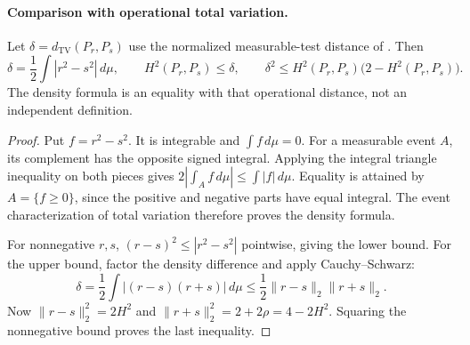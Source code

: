 \paragraph{Comparison with operational total variation.}

\begin{theorem}
\label{thm:hellinger-tv}
Let $\delta=d_{\mathrm{TV}}(P_r,P_s)$ use the normalized
measurable-test distance of . Then
\[
 \delta=\frac12\int|r^2-s^2|\,d\mu,
 \qquad
 H^2(P_r,P_s)\le\delta,
 \qquad
 \delta^2\le H^2(P_r,P_s)\bigl(2-H^2(P_r,P_s)\bigr).
\]
The density formula is an equality with that operational distance,
not an independent definition.
\end{theorem}
\begin{proof}
Put $f=r^2-s^2$. It is integrable and $\int f\,d\mu=0$.
For a measurable event $A$, its complement has the opposite signed
integral. Applying the integral triangle inequality on both pieces gives
$2|\int_A f\,d\mu|\le\int|f|\,d\mu$.
Equality is attained by $A=\{f\ge0\}$, since the positive and negative
parts have equal integral. The event characterization of total variation
therefore proves the density formula.

For nonnegative $r,s$, $(r-s)^2\le|r^2-s^2|$ pointwise, giving
the lower bound. For the upper bound, factor the density difference
and apply Cauchy--Schwarz:
\[
 \delta=\frac12\int|(r-s)(r+s)|\,d\mu
 \le\frac12\|r-s\|_2\|r+s\|_2.
\]
Now $\|r-s\|_2^2=2H^2$ and
$\|r+s\|_2^2=2+2\rho=4-2H^2$.
Squaring the nonnegative bound proves the last inequality.
\end{proof}
